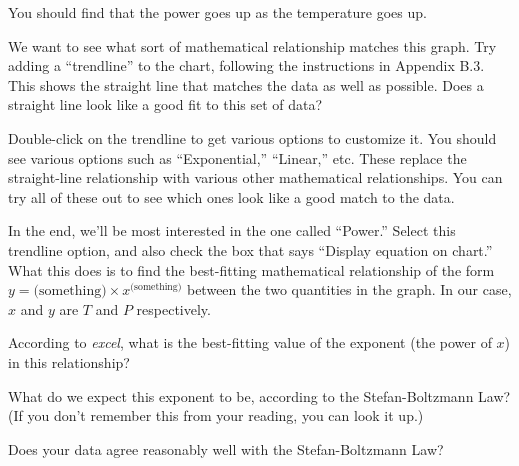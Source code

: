 You should find that the power goes up as the temperature goes up.

We want to see what sort of mathematical relationship matches this graph. 
Try adding a ``trendline'' to the chart, following the instructions
in Appendix B.3.
This shows the straight line
that matches the data as well as possible. Does a straight line look
like a good fit to this set of data?

\answerspace{1in}

Double-click on the trendline to get various options to customize it.
You should see various options such as ``Exponential,'' ``Linear,'' etc.
These replace the straight-line relationship with various other 
mathematical relationships. You can try all of these out to see
which ones look like a good match to the data.

In the end, we'll be most interested in the one called ``Power.'' Select
this trendline option, and also check the box that says ``Display
equation on chart.'' What this does is to find the best-fitting mathematical
relationship of the form $y=\mbox{(something)}\times x^{\mbox{(something)}}$
between the two quantities in the graph. In our case, $x$ and $y$
are $T$ and $P$ respectively.

According to \textit{excel}, what is the best-fitting value
of the exponent (the power of $x$) in this relationship?

\answerspace{1in}

What do we expect this exponent to be, according to the Stefan-Boltzmann
Law? (If you don't remember this from your reading, you can look it up.)

\answerspace{1in}

Does your data agree reasonably well with the Stefan-Boltzmann Law?


